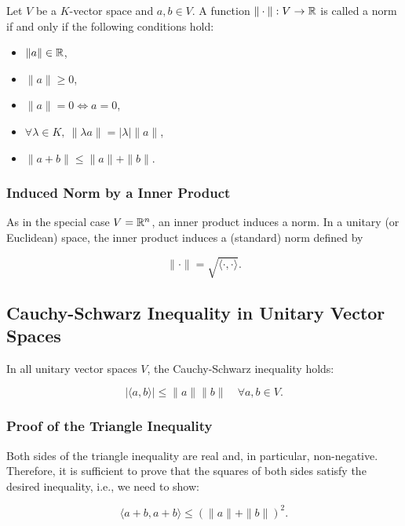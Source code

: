 Let \( V \) be a \( K \)-vector space and \( a, b \in V \). A function \( \| \cdot \| : V \to \mathbb{R} \) 
is called a norm if and only if the following conditions hold:

\begin{itemize}

    \item \( \|a\| \in \mathbb{R} \),

    \item \( \|a\| \geq 0 \),

    \item \( \|a\| = 0 \iff a = 0 \),

    \item \( \forall \lambda \in K, \ \| \lambda a \| = |\lambda| \| a \| \),

    \item \( \| a + b \| \leq \| a \| + \| b \| \).

\end{itemize}

\subsubsection{Induced Norm by a Inner Product}

As in the special case \( V = \mathbb{R}^n \), an inner product induces a norm.
In a unitary (or Euclidean) space, the inner product induces a (standard) norm defined by

\[
    \| \cdot \| = \sqrt{\langle \cdot, \cdot \rangle}.
\]

\subsection{Cauchy-Schwarz Inequality in Unitary Vector Spaces}

In all unitary vector spaces \( V \), the Cauchy-Schwarz inequality holds:

\[
    | \langle a, b \rangle | \leq \| a \| \| b \| \quad \forall a, b \in V.
\]

\subsubsection{Proof of the Triangle Inequality}

Both sides of the triangle inequality are real and, in particular, non-negative. 
Therefore, it is sufficient to prove that the squares of both sides satisfy the 
desired inequality, i.e., we need to show:

\[
    \langle a + b, a + b \rangle \leq {(\|a\| + \|b\|)}^2.
\]

